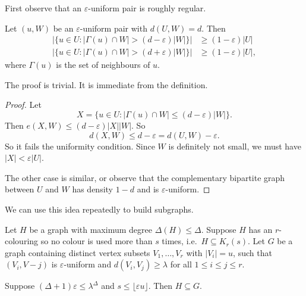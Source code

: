 \documentclass[a4paper]{article}
\begin{document}
First observe that an $\varepsilon$-uniform pair is roughly regular.
\begin{lemma}
  Let $(u, W)$ be an $\varepsilon$-uniform pair with $d(U, W) = d$. Then
  \begin{align*}
    |\{u \in U: |\Gamma(u) \cap W| > (d - \varepsilon) |W|\}| &\geq (1 - \varepsilon)|U|\\
    |\{u \in U: |\Gamma(u) \cap W| > (d + \varepsilon) |W|\}| &\geq (1 - \varepsilon)|U|,
  \end{align*}
  where $\Gamma(u)$ is the set of neighbours of $u$.
\end{lemma}
The proof is trivial. It is immediate from the definition.
\begin{proof}
  Let
  \[
    X = \{u \in U: |\Gamma(u) \cap W| \leq (d - \varepsilon)|W|\}.
  \]
  Then $e(X, W) \leq (d - \varepsilon) |X||W|$. So
  \[
    d(X, W) \leq d - \varepsilon = d(U, W) - \varepsilon.
  \]
  So it fails the uniformity condition. Since $W$ is definitely not small, we must have $|X| < \varepsilon |U|$.

  The other case is similar, or observe that the complementary bipartite graph between $U$ and $W$ has density $1 - d$ and is $\varepsilon$-uniform.
\end{proof}

We can use this idea repeatedly to build subgraphs.
\begin{lemma}
  Let $H$ be a graph with maximum degree $\Delta(H) \leq \Delta$. Suppose $H$ has an $r$-colouring so no colour is used more than $s$ times, i.e.\ $H \subseteq K_r(s)$. Let $G$ be a graph containing distinct vertex subsets $V_1, \ldots, V_r$ with $|V_i| = u$, such that $(V_i, V-j)$ is $\varepsilon$-uniform and $d(V_i, V_j) \geq \lambda$ for all $1 \leq i \leq j \leq r$.

  Suppose $(\Delta + 1) \varepsilon \leq \lambda^\Delta$ and $s \leq \lfloor \varepsilon u\rfloor$. Then $H \subseteq G$.
\end{lemma}
\end{document}
